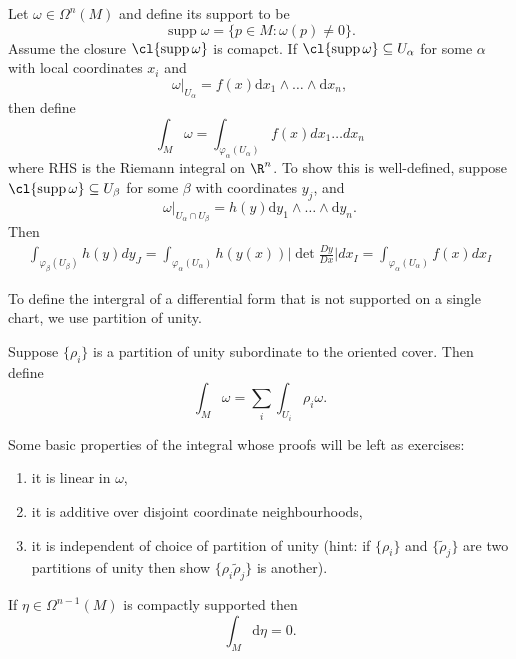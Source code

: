 \documentclass[a4paper]{article}
\DeclareMathOperator{\supp}{supp} %
\newcommand{\w}{\wedge}
\begin{document}
Let \(\omega \in \Omega^n(M)\) and define its support to be
\[
  \supp \omega = \{p \in M: \omega(p) \neq 0\}.
\]
Assume the closure \(\cl{\supp \omega}\) is comapct. If \(\cl{\supp \omega} \subseteq U_\alpha\) for some \(\alpha\) with local coordinates \(x_i\) and
\[
  \omega|_{U_\alpha} = f(x) \mathrm dx_1 \w \dots \w \mathrm dx_n,
\]
then define
\[
  \int_M \omega = \int_{\varphi_\alpha(U_\alpha)} f(x) dx_1 \dots dx_n
\]
where RHS is the Riemann integral on \(\R^n\). To show this is well-defined, suppose \(\cl{\supp \omega} \subseteq U_\beta\) for some \(\beta\) with coordinates \(y_j\), and
\[
  \omega|_{U_\alpha \cap U_\beta} = h(y) \mathrm dy_1 \w \dots \w \mathrm d y_n.
\]
Then
\begin{align*}
  \int_{\varphi_\beta(U_\beta)} h(y) dy_J
  = \int_{\varphi_\alpha(U_\alpha)} h(y(x)) \Bigg| \det \frac{D y}{D x} \Bigg| d x_I
  = \int_{\varphi_\alpha(U_\alpha)} f(x) dx_I
\end{align*}

To define the intergral of a differential form that is not supported on a single chart, we use partition of unity.

\begin{definition}
  Suppose \(\{\rho_i\}\) is a partition of unity subordinate to the oriented cover. Then define
  \[
    \int_M \omega = \sum_i \int_{U_i} \rho_i \omega.
  \]
\end{definition}

Some basic properties of the integral whose proofs will be left as exercises:
\begin{enumerate}
\item it is linear in \(\omega\),
\item it is additive over disjoint coordinate neighbourhoods,
\item it is independent of choice of partition of unity (hint: if \(\{\rho_i\}\) and \(\{\tilde \rho_j\}\) are two partitions of unity then show \(\{\rho_i \tilde \rho_j\}\) is another).
\end{enumerate}

\begin{theorem}
  If \(\eta \in \Omega^{n - 1}(M)\) is compactly supported then
  \[
    \int_M \mathrm d \eta = 0.
  \]
\end{theorem}
\end{document}
